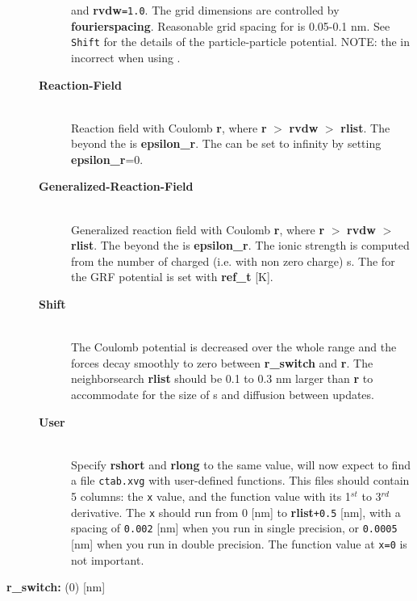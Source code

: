 \begin{description}
\begin{description}
and {\bf rvdw}{\tt =1.0}. The grid
dimensions are controlled by {\bf fourierspacing}.
Reasonable grid spacing for  is 0.05-0.1 nm.
See {\tt Shift} for the details of the particle-particle potential.
NOTE: the  in incorrect when using .
\item[{\bf Reaction-Field}]\mbox{}\\
Reaction field with Coulomb  {\bf r},
where {\bf r} {\tt $>$} {\bf rvdw} {\tt $>$} {\bf rlist}.
The  beyond the  is {\bf epsilon\_r}.
The  can be set to infinity by setting {\bf epsilon\_r}=0.
\item[{\bf Generalized-Reaction-Field}]\mbox{}\\
Generalized reaction field with Coulomb  {\bf r},
where {\bf r} {\tt $>$} {\bf rvdw} {\tt $>$} {\bf rlist}.
The  beyond the  is {\bf epsilon\_r}.
The ionic strength is computed from the number of charged 
(i.e. with non zero charge) s.
The  for the GRF potential is set with 
{\bf ref\_t} [K].
\item[{\bf Shift}]\mbox{}\\
The Coulomb
potential is decreased over the whole range and the forces decay smoothly
to zero between {\bf r\_switch} and {\bf r}.
The neighborsearch  {\bf rlist} should be 0.1 to 0.3 nm larger than
{\bf r} to accommodate for the size of s and diffusion
between  updates.
\item[{\bf User}]\mbox{}\\
Specify {\bf rshort} and {\bf rlong} to the same value, {\tt {}}
will now expect to find a file {\tt ctab.xvg} with user-defined functions.
This files should contain 5 columns:
the {\tt x} value, and the function value with its 1$^{st}$
to 3$^{rd}$ derivative. The {\tt x} should run from 0 [nm] to
{\bf rlist}{\tt +0.5} [nm], with a spacing of {\tt 0.002}
[nm] when you run in single precision, or {\tt 0.0005} [nm] when
you run in double precision. The function value at {\tt x=0} is not
important.
\end{description}
\item[{\bf r\normindex{coulomb}\_switch: }(0) {[nm]}]\mbox{}\\

\end{description}
